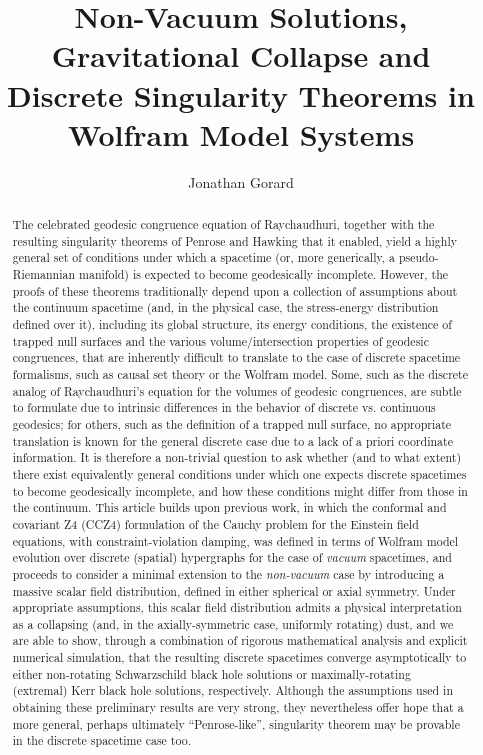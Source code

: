 \documentclass{article}
\title{Non-Vacuum Solutions, Gravitational Collapse and Discrete Singularity Theorems in Wolfram Model Systems}
\author[1, 2]{Jonathan Gorard}
\affil[1]{Cardiff University, Cardiff, UK\footnote{\href{mailto:gorardj@cardiff.ac.uk}{gorardj@cardiff.ac.uk}}}
\affil[2]{University of Cambridge, Cambridge, UK\footnote{\href{mailto:jg865@cantab.ac.uk}{jg865@cantab.ac.uk}}}
\begin{document}
\maketitle

\begin{abstract}
The celebrated geodesic congruence equation of Raychaudhuri, together with the resulting singularity theorems of Penrose and Hawking that it enabled, yield a highly general set of conditions under which a spacetime (or, more generically, a pseudo-Riemannian manifold) is expected to become geodesically incomplete. However, the proofs of these theorems traditionally depend upon a collection of assumptions about the continuum spacetime (and, in the physical case, the stress-energy distribution defined over it), including its global structure, its energy conditions, the existence of trapped null surfaces and the various volume/intersection properties of geodesic congruences, that are inherently difficult to translate to the case of discrete spacetime formalisms, such as causal set theory or the Wolfram model. Some, such as the discrete analog of Raychaudhuri's equation for the volumes of geodesic congruences, are subtle to formulate due to intrinsic differences in the behavior of discrete vs. continuous geodesics; for others, such as the definition of a trapped null surface, no appropriate translation is known for the general discrete case due to a lack of a priori coordinate information. It is therefore a non-trivial question to ask whether (and to what extent) there exist equivalently general conditions under which one expects discrete spacetimes to become geodesically incomplete, and how these conditions might differ from those in the continuum. This article builds upon previous work, in which the conformal and covariant Z4 (CCZ4) formulation of the Cauchy problem for the Einstein field equations, with constraint-violation damping, was defined in terms of Wolfram model evolution over discrete (spatial) hypergraphs for the case of \textit{vacuum} spacetimes, and proceeds to consider a minimal extension to the \textit{non-vacuum} case by introducing a massive scalar field distribution, defined in either spherical or axial symmetry. Under appropriate assumptions, this scalar field distribution admits a physical interpretation as a collapsing (and, in the axially-symmetric case, uniformly rotating) dust, and we are able to show, through a combination of rigorous mathematical analysis and explicit numerical simulation, that the resulting discrete spacetimes converge asymptotically to either non-rotating Schwarzschild black hole solutions or maximally-rotating (extremal) Kerr black hole solutions, respectively. Although the assumptions used in obtaining these preliminary results are very strong, they nevertheless offer hope that a more general, perhaps ultimately ``Penrose-like'', singularity theorem may be provable in the discrete spacetime case too.
\end{abstract}
\end{document}

